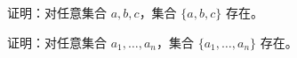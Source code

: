 \documentclass[../../../include/open-logic-section]{subfiles}
\begin{document}
\begin{prob}
证明：对任意集合 $a, b, c$，集合 $\{a, b, c\}$ 存在。
\end{prob}

\begin{prob}
证明：对任意集合 $a_1, \ldots, a_n$，集合 $\{a_1, \ldots,
a_n\}$ 存在。
\end{prob}

\end{document}
